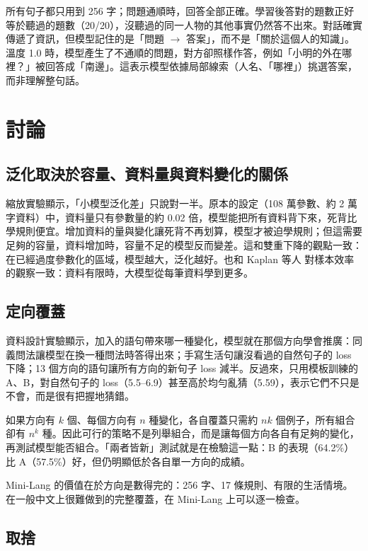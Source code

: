 \documentclass[11pt,a4paper]{article}
\begin{document}
所有句子都只用到 256 字；問題通順時，回答全部正確。學習後答對的題數正好等於聽過的題數（20/20），沒聽過的同一人物的其他事實仍然答不出來。對話確實傳遞了資訊，但模型記住的是「問題 $\to$ 答案」，而不是「關於這個人的知識」。溫度 1.0 時，模型產生了不通順的問題，對方卻照樣作答，例如「小明的外在哪裡？」被回答成「南邊」。這表示模型依據局部線索（人名、「哪裡」）挑選答案，而非理解整句話。

\section{討論}\label{sec:discussion}

\subsection{泛化取決於容量、資料量與資料變化的關係}

縮放實驗顯示，「小模型泛化差」只說對一半。原本的設定（108 萬參數、約 2 萬字資料）中，資料量只有參數量的約 0.02 倍，模型能把所有資料背下來，死背比學規則便宜。增加資料的量與變化讓死背不再划算，模型才被迫學規則；但這需要足夠的容量，資料增加時，容量不足的模型反而變差。這和雙重下降的觀點一致：在已經過度參數化的區域，模型越大，泛化越好。也和 Kaplan 等人 \cite{kaplan2020scaling} 對樣本效率的觀察一致：資料有限時，大模型從每筆資料學到更多。

\subsection{定向覆蓋}

資料設計實驗顯示，加入的語句帶來哪一種變化，模型就在那個方向學會推廣：同義問法讓模型在換一種問法時答得出來；手寫生活句讓沒看過的自然句子的 loss 下降；13 個方向的語句讓所有方向的新句子 loss 減半。反過來，只用模板訓練的 A、B，對自然句子的 loss（5.5--6.9）甚至高於均勻亂猜（5.59），表示它們不只是不會，而是很有把握地猜錯。

如果方向有 $k$ 個、每個方向有 $n$ 種變化，各自覆蓋只需約 $nk$ 個例子，所有組合卻有 $n^k$ 種。因此可行的策略不是列舉組合，而是讓每個方向各自有足夠的變化，再測試模型能否組合。「兩者皆新」測試就是在檢驗這一點：B 的表現（64.2\%）比 A（57.5\%）好，但仍明顯低於各自單一方向的成績。

Mini-Lang 的價值在於方向是數得完的：256 字、17 條規則、有限的生活情境。在一般中文上很難做到的完整覆蓋，在 Mini-Lang 上可以逐一檢查。

\subsection{取捨}
\end{document}
